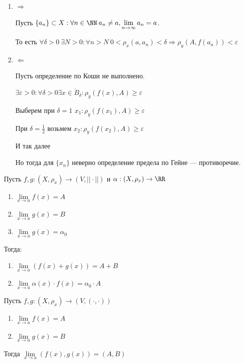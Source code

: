 \begin{enumerate}
    \item
        \( \Rightarrow \)

        Пусть \( \{ a_n \} \subset X : \forall n \in \NN \: a_n \neq a, \lim\limits_{n \to \infty} a_n = a \).

        То есть
        \(
            \forall \delta > 0 \: \exists N > 0 : \forall n > N \: 0 < \rho_x (a, a_n) < \delta
            \Rightarrow
            \rho_y (A, f(a_n)) < \varepsilon
        \)
    \item
        \( \Leftarrow \)

        Пусть определение по Коши не выполнено.

        \( \exists \varepsilon > 0 : \forall \delta > 0 \exists x \in \mathring{B}_{\delta} : \rho_y(f(x), A) \geq \varepsilon \)

        Выберем при \( \delta = 1 \) \( x_1 : \rho_y (f(x_1), A) \geq \varepsilon \)

        При \( \delta = \frac{1}{2} \) возьмем \( x_2 : \rho_y (f(x_2), A) \geq \varepsilon \)

        И так далее

        Но тогда для \( \{ x_n \} \) неверно определение предела по Гейне --- противоречие.
\end{enumerate}

\begin{thrm}{}{}
    Пусть \( f, g : (X, \rho_x) \to (V, || \cdot ||) \) и \( \alpha : (X, \rho_x) \to \RR \)

    \begin{enumerate}
        \item
            \( \lim\limits_{x \to a} f(x) = A \)
        \item
            \( \lim\limits_{x \to a} g(x) = B \)
        \item
            \( \lim\limits_{x \to a} g(x) = \alpha_0 \)
    \end{enumerate}

    Тогда:
    \begin{enumerate}
        \item
            \( \lim\limits_{x \to a} (f(x) + g(x)) = A + B \)
        \item
            \( \lim\limits_{x \to a} \alpha(x) \cdot f(x) = \alpha_0 \cdot A \)
    \end{enumerate}
\end{thrm}


\begin{thrm}{}{}
    Пусть \( f, g : (X, \rho_x) \to (V, (\cdot, \cdot) ) \)

    \begin{enumerate}
        \item
            \( \lim\limits_{x \to a} f(x) = A \)
        \item
            \( \lim\limits_{x \to a} g(x) = B \)
    \end{enumerate}

    Тогда \( \lim\limits_{x \to a} (f(x), g(x)) = (A, B) \)
\end{thrm}

